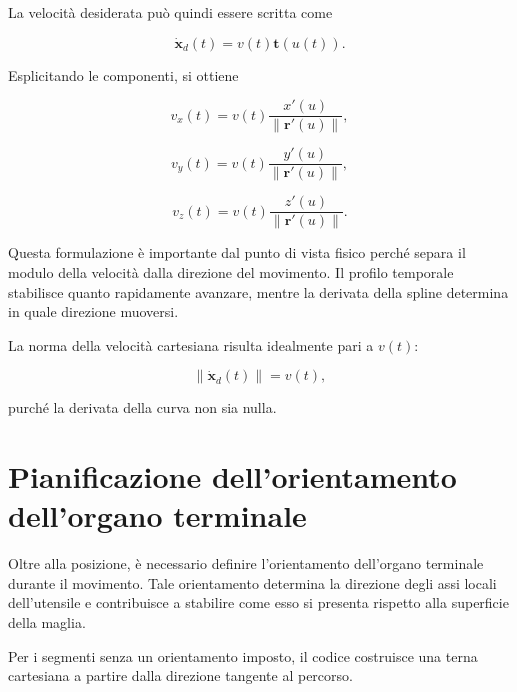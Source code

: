 La velocità desiderata può quindi essere scritta come

\begin{equation}
    \dot{\mathbf{x}}_d(t)
    =v(t)\mathbf{t}(u(t)).
    \label{eq:velocita_cartesiana}
\end{equation}

Esplicitando le componenti, si ottiene

\begin{equation}
    v_x(t)=
    v(t)\frac{x'(u)}{\|\mathbf{r}'(u)\|},
\end{equation}

\begin{equation}
    v_y(t)=
    v(t)\frac{y'(u)}{\|\mathbf{r}'(u)\|},
\end{equation}

\begin{equation}
    v_z(t)=
    v(t)\frac{z'(u)}{\|\mathbf{r}'(u)\|}.
\end{equation}

Questa formulazione è importante dal punto di vista fisico perché separa il modulo della velocità dalla direzione del movimento. Il profilo temporale stabilisce quanto rapidamente avanzare, mentre la derivata della spline determina in quale direzione muoversi.

La norma della velocità cartesiana risulta idealmente pari a $v(t)$:

\begin{equation}
    \|\dot{\mathbf{x}}_d(t)\|=v(t),
\end{equation}

purché la derivata della curva non sia nulla.

\section{Pianificazione dell'orientamento dell'organo terminale}

Oltre alla posizione, è necessario definire l'orientamento dell'organo terminale durante il movimento. Tale orientamento determina la direzione degli assi locali dell'utensile e contribuisce a stabilire come esso si presenta rispetto alla superficie della maglia.

Per i segmenti senza un orientamento imposto, il codice costruisce una terna cartesiana a partire dalla direzione tangente al percorso.


